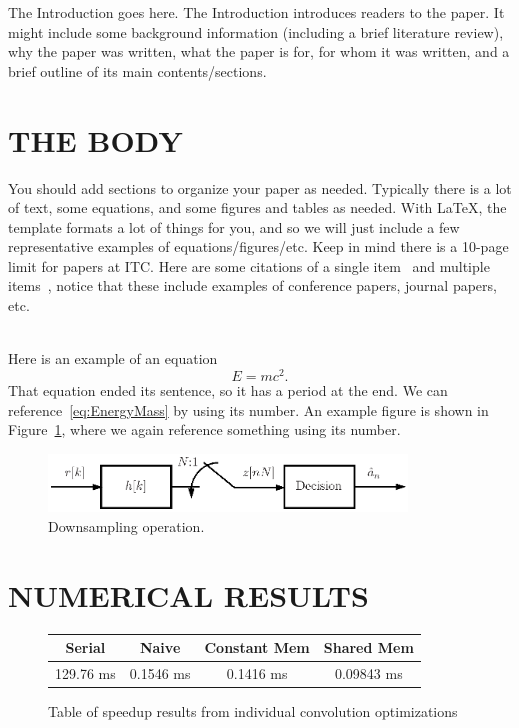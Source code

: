 \documentclass[12pt]{article}
\begin{document}
\noindent
The Introduction goes here. The Introduction introduces readers to the paper. It might include some background information (including a brief literature review), why the paper was written, what the paper is for, for whom it was written, and a brief outline of its main contents/sections.



\section{\MakeUppercase{The Body}}
\label{sec:Body}

\noindent
You should add sections to organize your paper as needed. Typically there is a lot of text, some equations, and some figures and tables as needed. With LaTeX, the template formats a lot of things for you, and so we will just include a few representative examples of equations/figures/etc. Keep in mind there is a 10-page limit for papers at ITC. Here are some citations of a single item~\cite{CcsdsOrangeBook} and multiple items~\cite{ChalfantIrving,CoverBook,DapperHill,ForneyVa,Irig106-04,LiSimon}, notice that these include examples of conference papers, journal papers, etc.

~\\
\noindent
Here is an example of an equation
\begin{equation}
E = mc^2.
\label{eq:EnergyMass}
\end{equation}
That equation ended its sentence, so it has a period at the end. We can reference~\eqref{eq:EnergyMass} by using its number. An example figure is shown in Figure~\ref{fig:Downsample}, where we again reference something using its number.

\begin{figure}
\centering\includegraphics[width=3.75in]{figures/Downsample}
\caption{Downsampling operation.}
\label{fig:Downsample}
\end{figure}




\section{\MakeUppercase{Numerical Results}}
\label{sec:NumericalResults}
\begin{figure}[h]
\begin{center}
\begin{tabular}{ |c|c|c|c|} 
 \hline
 Serial & Naive & Constant Mem & Shared Mem \\ 
 \hline
 129.76 ms & 0.1546 ms & 0.1416 ms & 0.09843 ms\\
 \hline
\end{tabular}\caption{Table of speedup results from individual convolution optimizations}\label{table:convolutionTimes}
\end{center}
\end{figure}
\end{document}
